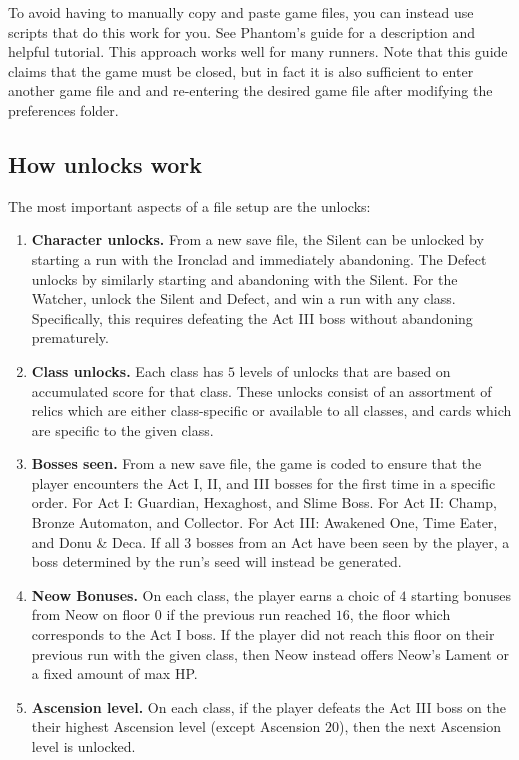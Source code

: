 \documentclass[12pt]{amsart}
\begin{document}
To avoid having to manually copy and paste game files, you can instead use scripts that do this work for you.  
See Phantom's guide \cite{PhantomPreferences} for a description and helpful tutorial.  
This approach works well for many runners.  
Note that this guide claims that the game must be closed, but in fact it is also sufficient to enter another game file and and re-entering the desired game file after modifying the \textrm{preferences} folder.  

\subsection{How unlocks work}
The most important aspects of a file setup are the unlocks: 
\begin{enumerate}
	\item 
		\textbf{Character unlocks. }
		From a new save file, the Silent can be unlocked by starting a run with the Ironclad and immediately abandoning.  
		The Defect unlocks by similarly starting and abandoning with the Silent.  
		For the Watcher, unlock the Silent and Defect, and win a run with any class.  
		Specifically, this requires defeating the Act III boss without abandoning prematurely.  
	\item 
		\textbf{Class unlocks. }
		Each class has $5$ levels of unlocks that are based on accumulated score for that class.  
		These unlocks consist of an assortment of relics which are either class-specific or available to all classes, and cards which are specific to the given class.  
	\item 
		\textbf{Bosses seen. }
		From a new save file, the game is coded to ensure that the player encounters the Act I, II, and III bosses for the first time in a specific order.  
		For Act I: Guardian, Hexaghost, and Slime Boss.  
		For Act II: Champ, Bronze Automaton, and Collector.  
		For Act III: Awakened One, Time Eater, and Donu \& Deca.  
		If all $3$ bosses from an Act have been seen by the player, a boss determined by the run's seed will instead be generated.  
	\item 
		\textbf{Neow Bonuses. }
		On each class, the player earns a choic of $4$ starting bonuses from Neow on floor $0$ if the previous run reached $16$, the floor which corresponds to the Act I boss.  
		If the player did not reach this floor on their previous run with the given class, then Neow instead offers Neow's Lament or a fixed amount of max HP.  
	\item 
		\textbf{Ascension level.  }
		On each class, if the player defeats the Act III boss on the their highest Ascension level (except Ascension $20$), then the next Ascension level is unlocked.  
\end{enumerate}
\end{document}

